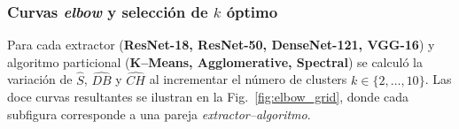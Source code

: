 \subsubsection{Curvas \emph{elbow} y selección de $k$ óptimo}

Para cada extractor (\textbf{ResNet-18, ResNet-50, DenseNet-121, VGG-16})
y algoritmo particional (\textbf{K–Means, Agglomerative, Spectral})
se calculó la variación de \(\widehat S\), \(\widehat{DB}\) y
\(\widehat{CH}\) al incrementar el número de clusters
\(k\in\{2,\dots,10\}\).
Las doce curvas resultantes se ilustran en la
Fig.~\ref{fig:elbow_grid}, donde cada subfigura corresponde a una pareja
\emph{extractor–algoritmo}.


